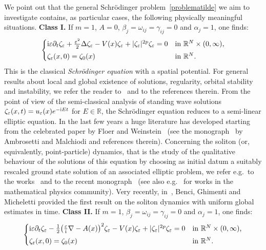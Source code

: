 \documentclass[11pt]{amsart}
\numberwithin{equation}{section}
\theoremstyle{definition}
\begin{document}
\vskip2pt
\noindent
We point out that the general Schr\"odinger problem~\eqref{problematilde} we aim to investigate contains,
as particular cases, the following physically meaningful situations.
\vskip8pt
\noindent
{\bf Class I.}
If $m=1$, $A=0$, $\beta_j=\omega_{ij}=\gamma_{ij}=0$ and $\alpha_j=1$, one finds:
    \begin{equation*}
    \begin{cases}
	{{\rm i}}{\varepsilon}\partial_t\zeta_{\varepsilon}+\frac{{\varepsilon}^2}{2}\Delta\zeta_{\varepsilon}-V(x)\zeta_{\varepsilon}
        +|\zeta_{\varepsilon}|^{2p}\zeta_{\varepsilon}=0 & \text{in ${{\mathbb R}}^N\times(0,\infty)$,} \\
        \noalign{\vskip3pt}
        \zeta_{\varepsilon}(x,0)=\zeta_0(x) & \text{in ${{\mathbb R}}^N$}.
    \end{cases}
\end{equation*}
This is the classical {\em Schr\"odinger equation} with a spatial potential. For general results about local and global
existence of solutions, regularity, orbital stability and instability, we refer the reader
to~\cite{cazenave} and to the references therein. From the point of view of the semi-classical analysis
of standing wave solutions $\zeta_{\varepsilon}(x,t)=u_{\varepsilon}(x)e^{-{{\rm i}} Et}$ for $E\in{{\mathbb R}}$, the Schr\"odinger equation reduces to
a semi-linear elliptic equation. In the last few years a huge literature has developed starting from
the celebrated paper by Floer and Weinstein~\cite{FW} (see
the monograph~\cite{ambook} by Ambrosetti and Malchiodi and references therein).
Concerning the soliton (or, equivalently, point-particle) dynamics, that is
the study of the qualitative behaviour of the solutions of this equation by choosing as initial datum a suitably rescaled
ground state solution of an associated elliptic problem, we refer e.g.~to the works~\cite{bronski,FGJS,GSS,Keerani2}
and to the recent monograph~\cite{carlesb} (see also e.g.~\cite{KN,KM}
for works in the mathematical physics community). Very recently, in~\cite{BeghMi},
Benci, Ghimenti and Micheletti provided the first result on the soliton dynamics
with uniform global estimates in time.
\vskip4pt
\noindent
{\bf Class II.}  If $m=1$, $\beta_j=\omega_{ij}=\gamma_{ij}=0$ and $\alpha_j=1$, one finds:
    \begin{equation*}
    \begin{cases}       {{\rm i}}{\varepsilon}\partial_t\zeta_{\varepsilon}-\frac{1}{2}\big(\frac{\varepsilon}{{\rm i}}\nabla-A(x)\big)^2\zeta_{\varepsilon}-V(x)\zeta_{\varepsilon}
        +|\zeta_{\varepsilon}|^{2p}\zeta_{\varepsilon}=0 & \text{in ${{\mathbb R}}^N\times(0,\infty)$,} \\
        \noalign{\vskip3pt}
        \zeta_{\varepsilon}(x,0)=\zeta_0(x) & \text{in ${{\mathbb R}}^N$}.
    \end{cases}
\end{equation*}
\end{document}
